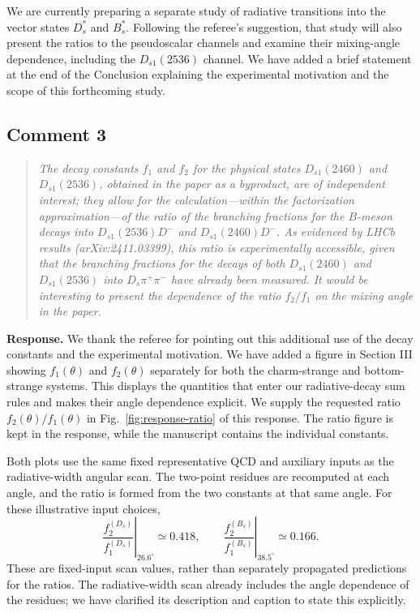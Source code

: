 \documentclass[11pt,a4paper]{article}
\newcommand{\commentheading}[1]{\Needspace{7\baselineskip}\subsection*{Comment #1}}
\begin{document}
We are currently preparing a separate study of radiative transitions
into the vector states $D_s^*$ and $B_s^*$. Following the referee's
suggestion, that study will also present the ratios to the pseudoscalar
channels and examine their mixing-angle dependence, including the
$D_{s1}(2536)$ channel. We have added a brief statement at the end of
the Conclusion explaining the experimental motivation and the scope
of this forthcoming study.

\commentheading{3}
\begin{quote}\small\itshape
The decay constants $f_1$ and $f_2$ for the physical states
$D_{s1}(2460)$ and $D_{s1}(2536)$, obtained in the paper as a byproduct,
are of independent interest; they allow for the calculation---within the
factorization approximation---of the ratio of the branching fractions
for the $B$-meson decays into $D_{s1}(2536)D^-$ and
$D_{s1}(2460)D^-$. As evidenced by LHCb results (arXiv:2411.03399),
this ratio is experimentally accessible, given that the branching
fractions for the decays of both $D_{s1}(2460)$ and $D_{s1}(2536)$
into $D_s\pi^+\pi^-$ have already been measured. It would be interesting
to present the dependence of the ratio $f_2/f_1$ on the mixing angle
in the paper.
\end{quote}

\textbf{Response.}
We thank the referee for pointing out this additional use of the decay
constants and the experimental motivation. We have added a figure in
Section III showing $f_1(\theta)$ and $f_2(\theta)$ separately for both
the charm-strange and bottom-strange systems. This displays the quantities
that enter our radiative-decay sum rules and makes their angle dependence
explicit. We supply the requested ratio $f_2(\theta)/f_1(\theta)$ in
Fig.~\ref{fig:response-ratio} of this response. The ratio figure is kept
in the response, while the manuscript contains the individual constants.

Both plots use the same fixed representative QCD and auxiliary inputs
as the radiative-width angular scan. The two-point residues are recomputed
at each angle, and the ratio is formed from the two constants at that
same angle. For these illustrative input choices,
\begin{equation}
 \left.\frac{f_2^{(D_s)}}{f_1^{(D_s)}}\right|_{26.6^\circ}
 \simeq 0.418,\qquad
 \left.\frac{f_2^{(B_s)}}{f_1^{(B_s)}}\right|_{38.5^\circ}
 \simeq 0.166.
\end{equation}
These are fixed-input scan values, rather than separately propagated
predictions for the ratios. The radiative-width scan already includes
the angle dependence of the residues; we have clarified its description
and caption to state this explicitly.
\end{document}
